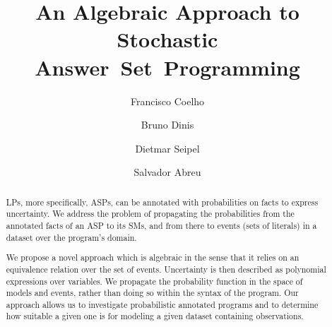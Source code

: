 \documentclass[x11names]{tlp}
\begin{document}

\title{%
	An Algebraic Approach to Stochastic
	Answer~Set~Programming
}
\ifTLP

	\begin{authgrp}
		\author{ }

		\author{ }

		\author{ }

		\author{ }
	\end{authgrp}
\else
	\author{%
		Francisco Coelho   \and %
		Bruno Dinis        \and %
		Dietmar Seipel       \and %
		Salvador Abreu     %
	}
\fi

\maketitle

\begin{abstract}
	\Aclp{LP}, more specifically, \Aclp{ASP}, can be annotated with
	probabilities on facts to express uncertainty.  We address the
	problem of propagating the probabilities from the annotated facts of
	an \acl{ASP} to its \aclp{SM}, and from there to events (sets of literals) in a dataset over the program's
	domain. %

	We propose a novel approach which is algebraic in the sense that it relies on
	an equivalence relation over the set of events. Uncertainty is then described
	as polynomial expressions over variables. We propagate the probability
	function in the space of models and events, rather than doing so within the
	syntax of the program.
	Our approach allows us to investigate probabilistic annotated programs and to
	determine how suitable a given one is for modeling a given dataset containing
	observations.
\end{abstract}
\end{document}
